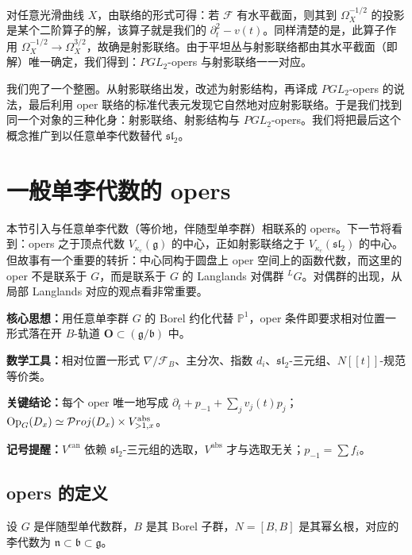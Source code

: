 对任意光滑曲线 $X$，由联络的形式可得：若 $\mathcal{F}$ 有水平截面，则其到 $\Omega_X^{-1/2}$ 的投影是某个二阶算子的解，该算子就是我们的 $\partial_t^2-v(t)$。同样清楚的是，此算子作用 $\Omega_X^{-1/2}\to\Omega_X^{3/2}$，故确是射影联络。由于平坦丛与射影联络都由其水平截面（即解）唯一确定，我们得到：$PGL_2$-opers 与射影联络一一对应。

我们兜了一个整圈。从射影联络出发，改述为射影结构，再译成 $PGL_2$-opers 的说法，最后利用 oper 联络的标准代表元发现它自然地对应射影联络。于是我们找到同一个对象的三种化身：射影联络、射影结构与 $PGL_2$-opers。我们将把最后这个概念推广到以任意单李代数替代 $\mathfrak{sl}_2$。

\section{一般单李代数的 opers}

本节引入与任意单李代数（等价地，伴随型单李群）相联系的 opers。下一节将看到：opers 之于顶点代数 $V_{\kappa_c}(\mathfrak{g})$ 的中心，正如射影联络之于 $V_{\kappa_c}(\mathfrak{sl}_2)$ 的中心。但故事有一个重要的转折：中心同构于圆盘上 oper 空间上的函数代数，而这里的 oper 不是联系于 $G$，而是联系于 $G$ 的 Langlands 对偶群 ${}^LG$。对偶群的出现，从局部 Langlands 对应的观点看非常重要。

\begin{keypoints}
    \item \textbf{核心思想：}用任意单李群 $G$ 的 Borel 约化代替 $\mathbb{P}^1$，oper 条件即要求相对位置一形式落在开 $B$-轨道 $\mathbf{O}\subset(\mathfrak{g}/\mathfrak{b})$ 中。
    \item \textbf{数学工具：}相对位置一形式 $\nabla/\mathcal{F}_B$、主分次、指数 $d_i$、$\mathfrak{sl}_2$-三元组、$N[[t]]$-规范等价类。
    \item \textbf{关键结论：}每个 oper 唯一地写成 $\partial_t+p_{-1}+\sum_{j}v_j(t)p_j$；$\operatorname{Op}_G(D_x)\simeq\mathcal{P}roj(D_x)\times V^{\mathrm{abs}}_{>1,x}$。
    \item \textbf{记号提醒：}$V^{\mathrm{can}}$ 依赖 $\mathfrak{sl}_2$-三元组的选取，$V^{\mathrm{abs}}$ 才与选取无关；$p_{-1}=\sum f_i$。
\end{keypoints}

\subsection{opers 的定义}

设 $G$ 是伴随型单代数群，$B$ 是其 Borel 子群，$N=[B,B]$ 是其幂幺根，对应的李代数为 $\mathfrak{n}\subset\mathfrak{b}\subset\mathfrak{g}$。

